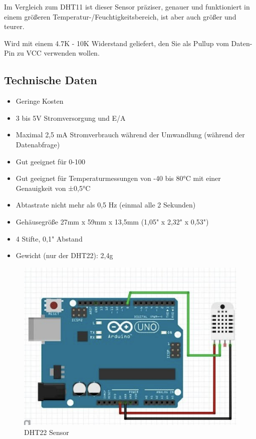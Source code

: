 \documentclass[conference]{IEEEtran}
\begin{document}
Im Vergleich zum DHT11 ist dieser Sensor präziser, genauer und funktioniert in einem größeren Temperatur-/Feuchtigkeitsbereich, ist aber auch größer und teurer.

Wird mit einem 4.7K - 10K Widerstand geliefert, den Sie als Pullup vom Daten-Pin zu VCC verwenden wollen.

\subsection{Technische Daten}
\begin{itemize}
	\item Geringe Kosten
	\item 3 bis 5V Stromversorgung und E/A
	\item Maximal 2,5 mA Stromverbrauch während der Umwandlung (während der Datenabfrage)
	\item Gut geeignet für 0-100%
	\item Gut geeignet für Temperaturmessungen von -40 bis 80°C mit einer Genauigkeit von ±0,5°C
	\item Abtastrate nicht mehr als 0,5 Hz (einmal alle 2 Sekunden)
	\item Gehäusegröße 27mm x 59mm x 13,5mm (1,05" x 2,32" x 0,53")
	\item 4 Stifte, 0,1" Abstand 
	\item Gewicht (nur der DHT22): 2,4g
\end{itemize}

	
\begin{figure}
	\begin{center}
		\includegraphics[scale=0.3]{dht22}
	\end{center}
	\caption{DHT22 Sensor}
\end{figure}
\end{document}
